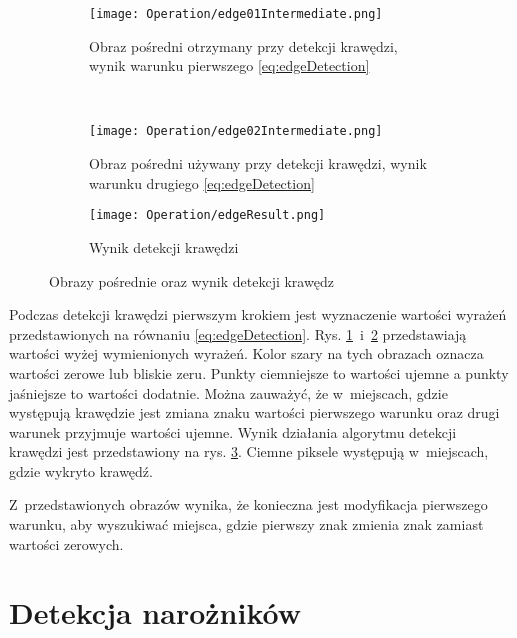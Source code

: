 \begin{figure}[h]
\begin{center}

\begin{subfigure}[t]{0.3\textwidth}
\texttt{[image: Operation/edge01Intermediate.png]}
\caption{Obraz pośredni otrzymany przy detekcji krawędzi, wynik warunku pierwszego \eqref{eq:edgeDetection}}
\label{fig:edgeIntermediate1}
\end{subfigure}
~
\begin{subfigure}[t]{0.3\textwidth}
\texttt{[image: Operation/edge02Intermediate.png]}
\caption{Obraz pośredni używany przy detekcji krawędzi, wynik warunku drugiego \eqref{eq:edgeDetection}}
\label{fig:edgeIntermediate2}
\end{subfigure}

\begin{subfigure}[t]{0.3\textwidth}
\texttt{[image: Operation/edgeResult.png]}
\caption{Wynik detekcji krawędzi}
\label{fig:edgeResult}
\end{subfigure}

\end{center}
\label{fig:showEdge}
\caption{Obrazy pośrednie oraz wynik detekcji krawędz}
\end{figure}

Podczas detekcji krawędzi pierwszym krokiem jest wyznaczenie wartości wyrażeń przedstawionych na równaniu \eqref{eq:edgeDetection}. Rys. \ref{fig:edgeIntermediate1}~i~\ref{fig:edgeIntermediate2} przedstawiają wartości wyżej wymienionych wyrażeń. Kolor szary na tych obrazach oznacza wartości zerowe lub bliskie zeru. Punkty ciemniejsze to wartości ujemne a punkty jaśniejsze to wartości dodatnie. Można zauważyć, że w~miejscach, gdzie występują krawędzie jest zmiana znaku wartości pierwszego warunku oraz drugi warunek przyjmuje wartości ujemne. Wynik działania algorytmu detekcji krawędzi jest przedstawiony na rys. \ref{fig:edgeResult}. Ciemne piksele występują w~miejscach, gdzie wykryto krawędź.

Z~przedstawionych obrazów wynika, że konieczna jest modyfikacja pierwszego warunku, aby wyszukiwać miejsca, gdzie pierwszy znak zmienia znak zamiast wartości zerowych.

\section{Detekcja narożników}
\label{sec:dzialanieCorner}

